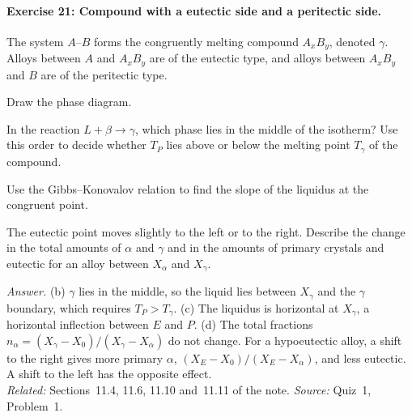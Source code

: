 \documentclass[11pt]{article}      %
\numberwithin{equation}{section}   %
\begin{document}
\paragraph{Exercise 21: Compound with a eutectic side and a peritectic side.}
The system $A$--$B$ forms the congruently melting compound $A_xB_y$, denoted $\gamma$. Alloys between $A$ and $A_xB_y$ are of the eutectic type, and alloys between $A_xB_y$ and $B$ are of the peritectic type.
\begin{parts}
    \item Draw the phase diagram.
    \item In the reaction $L + \beta \to \gamma$, which phase lies in the middle of the isotherm? Use this order to decide whether $T_P$ lies above or below the melting point $T_\gamma$ of the compound.
    \item Use the Gibbs--Konovalov relation to find the slope of the liquidus at the congruent point.
    \item The eutectic point moves slightly to the left or to the right. Describe the change in the total amounts of $\alpha$ and $\gamma$ and in the amounts of primary crystals and eutectic for an alloy between $X_\alpha$ and $X_\gamma$.
\end{parts}
\textit{Answer.} (b) $\gamma$ lies in the middle, so the liquid lies between $X_\gamma$ and the $\gamma$ boundary, which requires $T_P > T_\gamma$. (c) The liquidus is horizontal at $X_\gamma$, a horizontal inflection between $E$ and $P$. (d) The total fractions $n_\alpha = (X_\gamma - X_0)/(X_\gamma - X_\alpha)$ do not change. For a hypoeutectic alloy, a shift to the right gives more primary $\alpha$, $(X_E - X_0)/(X_E - X_\alpha)$, and less eutectic. A shift to the left has the opposite effect.\\
\textit{Related:} Sections~11.4, 11.6, 11.10 and~11.11 of the note. \textit{Source:} Quiz~1, Problem~1.

\needspace{302pt}
\end{document}
